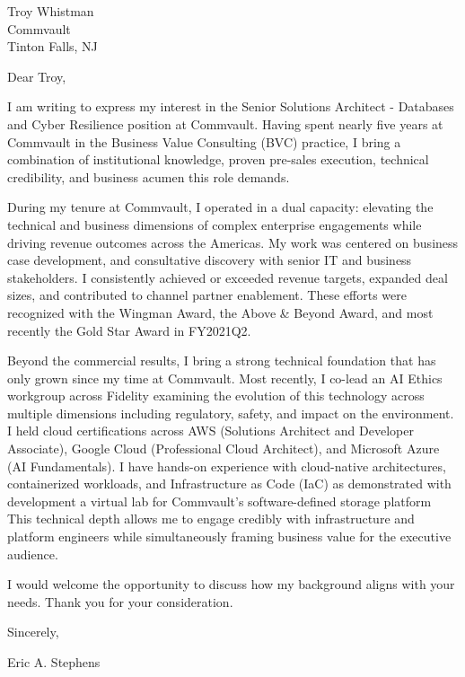 \documentclass[11pt]{letter}
\date{28 May 2026}
\begin{document}
\begin{letter}{Troy Whistman \\ Commvault \\ Tinton Falls, NJ}

\opening{Dear Troy,}

I am writing to express my interest in the Senior Solutions Architect - Databases and Cyber Resilience position at Commvault. Having spent nearly five years at Commvault in the Business Value Consulting (BVC) practice, I bring a combination of institutional knowledge, proven pre-sales execution, technical credibility, and business acumen this role demands.

During my tenure at Commvault, I operated in a dual capacity: elevating the technical and business dimensions of complex enterprise engagements while driving revenue outcomes across the Americas. My work was centered on business case development, and consultative discovery with senior IT and business stakeholders. I consistently achieved or exceeded revenue targets, expanded deal sizes, and contributed to channel partner enablement. These efforts were recognized with the Wingman Award, the Above \& Beyond Award, and most recently the Gold Star Award in FY2021Q2.

Beyond the commercial results, I bring a strong technical foundation that has only grown since my time at Commvault. Most recently, I co-lead an AI Ethics workgroup across Fidelity examining the evolution of this technology across multiple dimensions including regulatory, safety, and impact on the environment. I held cloud certifications across AWS (Solutions Architect and Developer Associate), Google Cloud (Professional Cloud Architect), and Microsoft Azure (AI Fundamentals). I have hands-on experience with cloud-native architectures, containerized workloads, and Infrastructure as Code (IaC) as demonstrated with development a virtual lab for Commvault's software-defined storage platform This technical depth allows me to engage credibly with infrastructure and platform engineers while simultaneously framing business value for the executive audience.

I would welcome the opportunity to discuss how my background aligns with your needs. Thank you for your consideration.

Sincerely, 
\newline
\newline
\newline


Eric A. Stephens

\end{letter}
\end{document}
